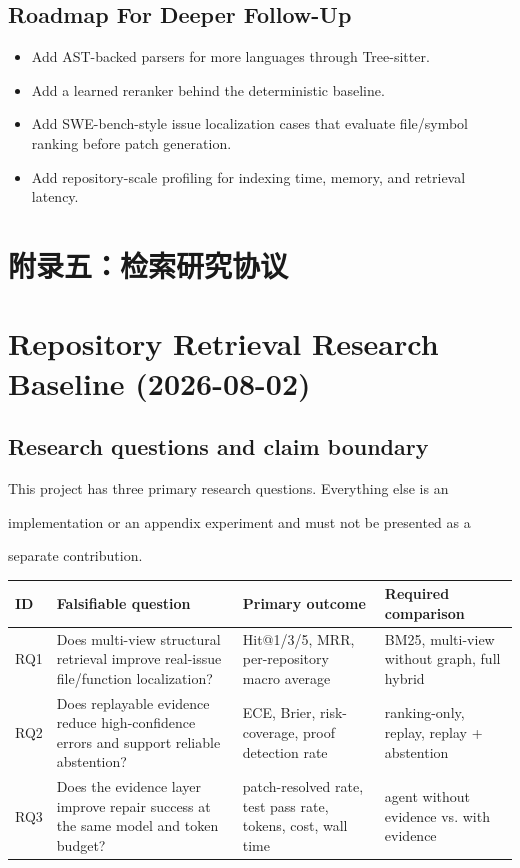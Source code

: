 \documentclass[UTF8,12pt,openany]{ctexbook}
\begin{document}
\section{Roadmap For Deeper Follow-Up}

\begin{itemize}
\item Add AST-backed parsers for more languages through Tree-sitter.
\item Add a learned reranker behind the deterministic baseline.
\item Add SWE-bench-style issue localization cases that evaluate file/symbol ranking before patch generation.
\item Add repository-scale profiling for indexing time, memory, and retrieval latency.
\end{itemize}


\clearpage
\chapter{附录五：检索研究协议}

\clearpage
\chapter{Repository Retrieval Research Baseline (2026-08-02)}

\section{Research questions and claim boundary}

This project has three primary research questions. Everything else is an\par
implementation or an appendix experiment and must not be presented as a\par
separate contribution.\par

\begin{center}
\small
\begin{longtable}{|p{}|p{}|p{}|p{}|}
\toprule
ID & Falsifiable question & Primary outcome & Required comparison \\
\midrule
RQ1 & Does multi-view structural retrieval improve real-issue file/function localization? & Hit@1/3/5, MRR, per-repository macro average & BM25, multi-view without graph, full hybrid \\
RQ2 & Does replayable evidence reduce high-confidence errors and support reliable abstention? & ECE, Brier, risk-coverage, proof detection rate & ranking-only, replay, replay + abstention \\
RQ3 & Does the evidence layer improve repair success at the same model and token budget? & patch-resolved rate, test pass rate, tokens, cost, wall time & agent without evidence vs. with evidence \\
\bottomrule
\end{longtable}
\end{center}
\end{document}
